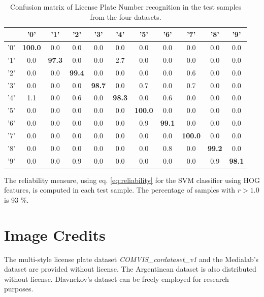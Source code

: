 \documentclass{ipol}
\begin{document}
\begin{table}[!h]
  \begin{center}
	\begin{tabular}{| l| c| c| c| c| c| c|c|c| c|c|}
    	\hline
    	         & '0' & '1' & '2' & '3' & '4' & '5' & '6' & '7' & '8' & '9'\\
    	  \hline
			'0'     & \textbf{100.0}  &   0.0  &   0.0  &   0.0  &   0.0  &   0.0  &   0.0  &   0.0  &   0.0  &   0.0   \\
			'1'   & 0.0  &  \textbf{97.3}  &   0.0  &   0.0  &   2.7  &   0.0  &   0.0  &   0.0  &   0.0   &  0.0   \\
			'2'     & 0.0  &   0.0 &  \textbf{99.4}  &   0.0  &   0.0  &   0.0  &   0.0  &   0.6  &   0.0  &   0.0   \\
			'3'       & 0.0  &   0.0  &   0.0 &  \textbf{98.7}  &   0.0  &   0.7  &   0.0  &   0.7  &   0.0  &   0.0 \\
			'4'      & 1.1   &  0.0  &   0.6  &   0.0 &  \textbf{98.3}  &   0.0  &   0.6  &   0.0  &   0.0  &   0.0    \\
			'5'    & 0.0  &   0.0  &   0.0  &   0.0  &   0.0  & \textbf{100.0}  &   0.0  &   0.0  &   0.0   &  0.0     \\
			'6'    & 0.0  &   0.0  &   0.0  &   0.0  &   0.0  &   0.9  & \textbf{99.1}  &   0.0  &   0.0  &   0.0   \\
			'7'       & 0.0   &  0.0  &   0.0  &   0.0  &   0.0   &  0.0  &   0.0  & \textbf{100.0}  &   0.0  &   0.0 \\
			'8'      & 0.0  &   0.0  &   0.0  &   0.0  &   0.0  &   0.0  &   0.8  &   0.0 &  \textbf{99.2}  &   0.0   \\
			'9'    & 0.0  &   0.0  &   0.9  &   0.0  &   0.0  &   0.0  &   0.0  &   0.0  &   0.9 &  \textbf{98.1}     \\
       \hline 
	\end{tabular}
  \end{center}
  \caption{Confusion matrix of License Plate Number recognition in the test samples from the four datasets.}
  \label{tab:MatConf}
\end{table}

The reliability measure, using eq. \ref{eq:reliability} for the SVM classifier using HOG features, is computed in each test sample.
The percentage of samples with $r>1.0$ is 93 \%.



\section*{Image Credits}
The multi-style license plate dataset \textit{COMVIS\_cardataset\_v1} and the Medialab's dataset are provided without license.
The Argentinean dataset is also distributed without license.
Dlavnekov's dataset can be freely employed for research purposes.



\end{document}
